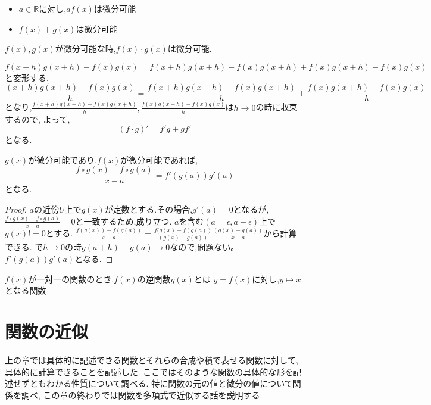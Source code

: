\begin{thm}
\begin{itemize}
  \item $a \in \mathbb{R}$に対し,$af(x)$は微分可能
  \item $f(x) + g(x)$は微分可能
\end{itemize}
\end{thm}

\begin{thm}
  $f(x), g(x)$が微分可能な時,$f(x)\cdot g(x)$は微分可能.
\end{thm}
$f(x+h)g(x+h) - f(x)g(x) = f(x+h)g(x+h) - f(x)g(x+h) + f(x)g(x+h) - f(x)g(x)$と変形する.
\begin{equation*}
\frac{(x+h)g(x+h) - f(x)g(x)}{h} = \frac{f(x+h)g(x+h) - f(x)g(x+h)}{h} + \frac{f(x)g(x+h) - f(x)g(x)}{h}
\end{equation*}
となり,$\frac{f(x+h)g(x+h) - f(x)g(x+h)}{h}, \frac{f(x)g(x+h) - f(x)g(x)}{h}$は$h \to 0$の時に収束するので,
よって,
\begin{equation*}
  (f \cdot g)' = f'g + g f'
\end{equation*}
となる.

\begin{thm}[合成関数の微分]
  $g(x)$が微分可能であり.$f(x)$が微分可能であれば,
  \begin{equation*}
    \frac{f\circ g (x) - f\circ g (a)}{x-a} = f'(g(a))g'(a)
  \end{equation*}
となる.
\end{thm}

\begin{proof}
$a$の近傍$U$上で$g(x)$が定数とする.その場合,$g'(a) =0$となるが,
$\frac{f\circ g (x) - f\circ g (a)}{x-a} = 0$と一致するため,成り立つ.
$a$を含む$(a = \epsilon, a + \epsilon)$上で$g(x) != 0$とする.
$\frac{f(g(x)) - f(g(a))}{x- a} = \frac{f(g(x)-f(g(a))}{(g(x)-g(a))} \frac{(g(x)-g(a))}{x-a}$から計算できる.
で$h \to 0$の時$g(a+h) - g(a) \to 0$なので,問題ない。
$f'(g(a)) g'(a)$となる.
\end{proof}


\begin{dfn}
$f(x)$が一対一の関数のとき,$f(x)$の逆関数$g(x)$とは
$y = f(x)$に対し,$y \mapsto x$となる関数
\end{dfn}



\section{関数の近似}
上の章では具体的に記述できる関数とそれらの合成や積で表せる関数に対して,具体的に計算できることを記述した.
ここではそのような関数の具体的な形を記述せずともわかる性質について調べる.
特に関数の元の値と微分の値について関係を調べ,
この章の終わりでは関数を多項式で近似する話を説明する.

